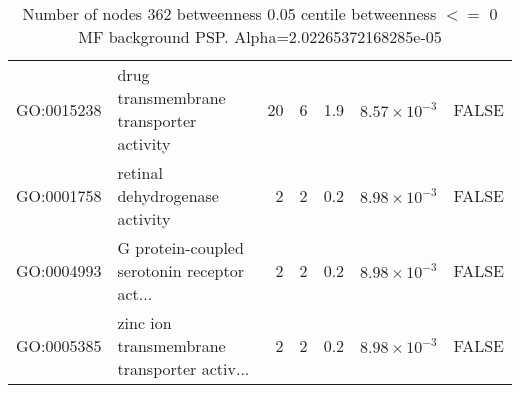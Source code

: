 \begin{table}[ht]
\begin{adjustbox}{max width=\textwidth}
\begin{tabular}{llrrrrl}
  GO:0015238 & drug transmembrane transporter activity & 20 & 6 & 1.9 & $8.57 \times 10^{-3}$ & FALSE \\ 
  GO:0001758 & retinal dehydrogenase activity & 2 & 2 & 0.2 & $8.98 \times 10^{-3}$ & FALSE \\ 
  GO:0004993 & G protein-coupled serotonin receptor act... & 2 & 2 & 0.2 & $8.98 \times 10^{-3}$ & FALSE \\ 
  GO:0005385 & zinc ion transmembrane transporter activ... & 2 & 2 & 0.2 & $8.98 \times 10^{-3}$ & FALSE \\ 
   \hline
\end{tabular}
\end{adjustbox}
\caption{Number of nodes 362 betweenness 0.05 centile  betweenness $<=$ 0 MF background PSP. Alpha=2.02265372168285e-05} 
\label{tab:Number of nodes 362 betweenness 0.05 centile  betweenness $<=$ 0 MF background PSP. Alpha=2.02265372168285e-05}
\end{table}


